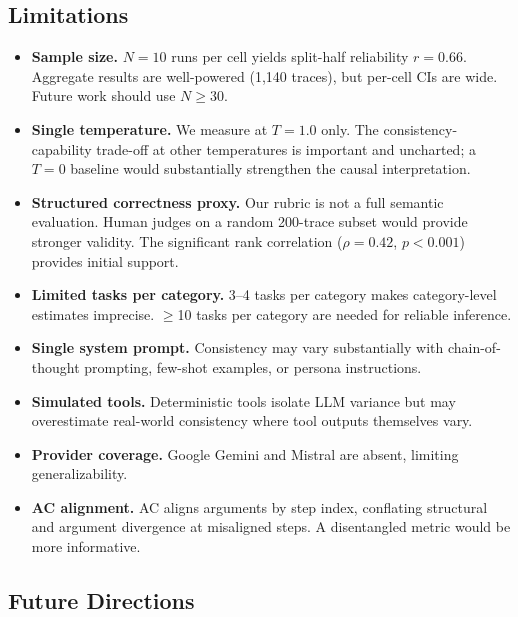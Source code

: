 \documentclass[letterpaper]{article}
\begin{document}
\subsection{Limitations}
\label{sec:limitations}

\begin{itemize}[leftmargin=1.5em]
  \item \textbf{Sample size.} $N = 10$ runs per cell yields split-half reliability
    $r = 0.66$. Aggregate results are well-powered (1,140 traces), but per-cell
    CIs are wide. Future work should use $N \geq 30$.
  \item \textbf{Single temperature.} We measure at $T = 1.0$ only. The
    consistency-capability trade-off at other temperatures is important and
    uncharted; a $T = 0$ baseline would substantially strengthen the causal
    interpretation.
  \item \textbf{Structured correctness proxy.} Our rubric is not a full semantic
    evaluation. Human judges on a random 200-trace subset would provide
    stronger validity. The significant rank correlation ($\rho = 0.42$,
    $p < 0.001$) provides initial support.
  \item \textbf{Limited tasks per category.} 3--4 tasks per category makes
    category-level estimates imprecise. $\geq$10 tasks per category are needed for
    reliable inference.
  \item \textbf{Single system prompt.} Consistency may vary substantially with
    chain-of-thought prompting, few-shot examples, or persona instructions.
  \item \textbf{Simulated tools.} Deterministic tools isolate LLM variance but may
    overestimate real-world consistency where tool outputs themselves vary.
  \item \textbf{Provider coverage.} Google Gemini and Mistral are absent, limiting
    generalizability.
  \item \textbf{AC alignment.} AC aligns arguments by step index, conflating
    structural and argument divergence at misaligned steps. A disentangled metric
    would be more informative.
\end{itemize}

\subsection{Future Directions}
\end{document}
